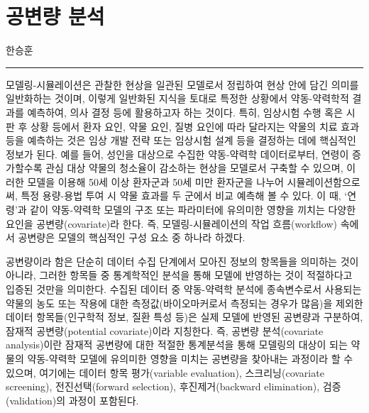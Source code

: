 \documentclass[
  10pt,
  krantz2,
  a4paper]{krantz}
\theoremstyle{definition}
\theoremstyle{definition}
\theoremstyle{definition}
\theoremstyle{remark}
\begin{document}
\hypertarget{covariate-analysis}{%
\chapter{공변량 분석}\label{covariate-analysis}}

한승훈

\begin{center}\rule{0.5\linewidth}{0.5pt}\end{center}

모델링-시뮬레이션은 관찰한 현상을 일관된 모델로서 정립하여 현상 안에 담긴 의미를 일반화하는 것이며, 이렇게 일반화된 지식을 토대로 특정한 상황에서 약동-약력학적 결과를 예측하여, 의사 결정 등에 활용하고자 하는 것이다. 특히, 임상시험 수행 혹은 시판 후 상황 등에서 환자 요인, 약물 요인, 질병 요인에 따라 달라지는 약물의 치료 효과 등을 예측하는 것은 임상 개발 전략 또는 임상시험 설계 등을 결정하는 데에 핵심적인 정보가 된다. 예를 들어, 성인을 대상으로 수집한 약동-약력학 데이터로부터, 연령이 증가할수록 관심 대상 약물의 청소율이 감소하는 현상을 모델로서 구축할 수 있으며, 이러한 모델을 이용해 50세 이상 환자군과 50세 미만 환자군을 나누어 시뮬레이션함으로써, 특정 용량-용법 투여 시 약물 효과를 두 군에서 비교 예측해 볼 수 있다. 이 때, `연령'과 같이 약동-약력학 모델의 구조 또는 파라미터에 유의미한 영향을 끼치는 다양한 요인을 공변량(covariate)라 한다. 즉, 모델링-시뮬레이션의 작업 흐름(workflow) 속에서 공변량은 모델의 핵심적인 구성 요소 중 하나라 하겠다.

공변량이라 함은 단순히 데이터 수집 단계에서 모아진 정보의 항목들을 의미하는 것이 아니라, 그러한 항목들 중 통계학적인 분석을 통해 모델에 반영하는 것이 적절하다고 입증된 것만을 의미한다. 수집된 데이터 중 약동-약력학 분석에 종속변수로서 사용되는 약물의 농도 또는 작용에 대한 측정값(바이오마커로서 측정되는 경우가 많음)을 제외한 데이터 항목들(인구학적 정보, 질환 특성 등)은 실제 모델에 반영된 공변량과 구분하여, 잠재적 공변량(potential covariate)이라 지칭한다. 즉, 공변량 분석(covariate analysis)이란 잠재적 공변량에 대한 적절한 통계분석을 통해 모델링의 대상이 되는 약물의 약동-약력학 모델에 유의미한 영향을 미치는 공변량을 찾아내는 과정이라 할 수 있으며, 여기에는 데이터 항목 평가(variable evaluation), 스크리닝(covariate screening), 전진선택(forward selection), 후진제거(backward elimination), 검증(validation)의 과정이 포함된다.
\end{document}
